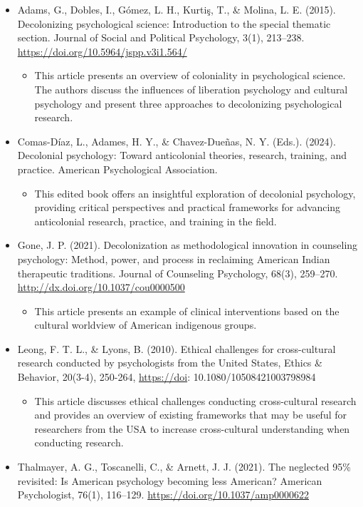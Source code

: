 \documentclass[
  11pt,
]{book}
\providecommand{\tightlist}{%
  \setlength{\itemsep}{0pt}\setlength{\parskip}{0pt}}
\begin{document}
\begin{itemize}
\tightlist
\item
  Adams, G., Dobles, I., Gómez, L. H., Kurtiş, T., \& Molina, L. E. (2015). Decolonizing psychological science: Introduction to the special thematic section. Journal of Social and Political Psychology, 3(1), 213--238. \url{https://doi.org/10.5964/jspp.v3i1.564/}

  \begin{itemize}
  \tightlist
  \item
    This article presents an overview of coloniality in psychological science. The authors discuss the influences of liberation psychology and cultural psychology and present three approaches to decolonizing psychological research.
  \end{itemize}
\item
  Comas-Díaz, L., Adames, H. Y., \& Chavez-Dueñas, N. Y. (Eds.). (2024). Decolonial psychology: Toward anticolonial theories, research, training, and practice. American Psychological Association.

  \begin{itemize}
  \tightlist
  \item
    This edited book offers an insightful exploration of decolonial psychology, providing critical perspectives and practical frameworks for advancing anticolonial research, practice, and training in the field.
  \end{itemize}
\item
  Gone, J. P. (2021). Decolonization as methodological innovation in counseling psychology: Method, power, and process in reclaiming American Indian therapeutic traditions. Journal of Counseling Psychology, 68(3), 259--270. \url{http://dx.doi.org/10.1037/cou0000500}

  \begin{itemize}
  \tightlist
  \item
    This article presents an example of clinical interventions based on the cultural worldview of American indigenous groups.
  \end{itemize}
\item
  Leong, F. T. L., \& Lyons, B. (2010). Ethical challenges for cross-cultural research conducted by psychologists from the United States, Ethics \& Behavior, 20(3-4), 250-264, \url{https://doi}: 10.1080/10508421003798984

  \begin{itemize}
  \tightlist
  \item
    This article discusses ethical challenges conducting cross-cultural research and provides an overview of existing frameworks that may be useful for researchers from the USA to increase cross-cultural understanding when conducting research.
  \end{itemize}
\item
  Thalmayer, A. G., Toscanelli, C., \& Arnett, J. J. (2021). The neglected 95\% revisited: Is American psychology becoming less American? American Psychologist, 76(1), 116--129. \url{https://doi.org/10.1037/amp0000622}


\end{itemize}
\end{document}
